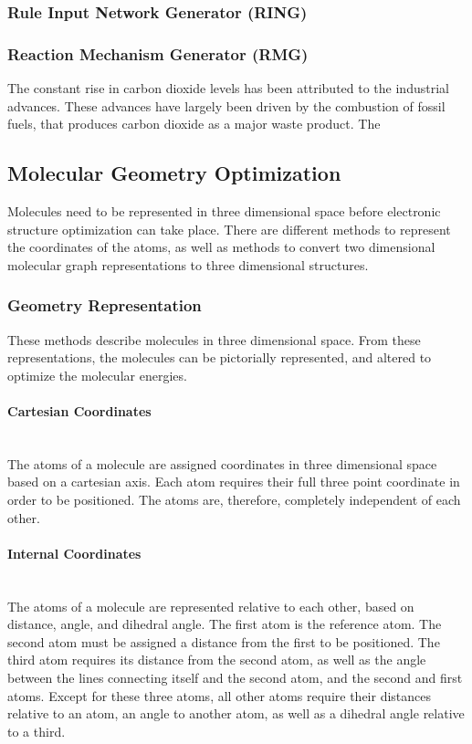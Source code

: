 \documentclass[12pt]{article}
\begin{document}
\subsubsection{Rule Input Network Generator (RING)}
\subsubsection{Reaction Mechanism Generator (RMG)}

The constant rise in carbon dioxide levels has been attributed to the industrial advances. These advances have largely been driven by the combustion of fossil fuels, that produces carbon dioxide as a major waste product. The 
\subsection{Molecular Geometry Optimization}

Molecules need to be represented in three dimensional space before electronic structure optimization can take place. There are different methods to represent the coordinates of the atoms, as well as methods to convert two dimensional molecular graph representations to three dimensional structures.

\subsubsection{Geometry Representation}

These methods describe molecules in three dimensional space. From these representations, the molecules can be pictorially represented, and altered to optimize the molecular energies.

\paragraph{Cartesian Coordinates}\mbox{}\\

The atoms of a molecule are assigned coordinates in three dimensional space based on a cartesian axis. Each atom requires their full three point coordinate in order to be positioned. The atoms are, therefore, completely independent of each other.

\paragraph{Internal Coordinates}\mbox{}\\

The atoms of a molecule are represented relative to each other, based on distance, angle, and dihedral angle. The first atom is the reference atom. The second atom must be assigned a distance from the first to be positioned. The third atom requires its distance from the second atom, as well as the angle between the lines connecting itself and the second atom, and the second and first atoms. Except for these three atoms, all other atoms require their distances relative to an atom, an angle to another atom, as well as a dihedral angle relative to a third.
\end{document}
